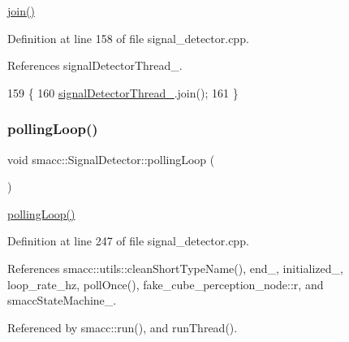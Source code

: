 \hyperlink{classsmacc_1_1SignalDetector_a636f704e469bf74b4a9fdb15bd63d5be}{join()} 

Definition at line 158 of file signal\+\_\+detector.\+cpp.



References signal\+Detector\+Thread\+\_\+.


\begin{DoxyCode}
159     \{
160         \hyperlink{classsmacc_1_1SignalDetector_a4346a400cd37eafc5d1d2e63d975785e}{signalDetectorThread\_}.join();
161     \}
\end{DoxyCode}
\mbox{\label{classsmacc_1_1SignalDetector_a2665e66cdae9f6533c64bbcecf3fa199}} 
\subsubsection{\texorpdfstring{polling\+Loop()}{pollingLoop()}}
{\footnotesize\ttfamily void smacc\+::\+Signal\+Detector\+::polling\+Loop (\begin{DoxyParamCaption}{ }\end{DoxyParamCaption})}

\hyperlink{classsmacc_1_1SignalDetector_a2665e66cdae9f6533c64bbcecf3fa199}{polling\+Loop()} 

Definition at line 247 of file signal\+\_\+detector.\+cpp.



References smacc\+::utils\+::clean\+Short\+Type\+Name(), end\+\_\+, initialized\+\_\+, loop\+\_\+rate\+\_\+hz, poll\+Once(), fake\+\_\+cube\+\_\+perception\+\_\+node\+::r, and smacc\+State\+Machine\+\_\+.



Referenced by smacc\+::run(), and run\+Thread().


